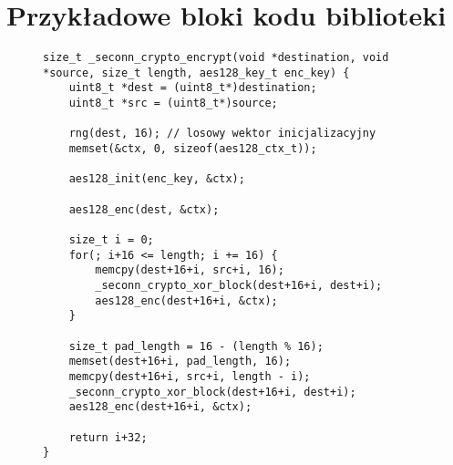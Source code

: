 \chapter{Przykładowe bloki kodu biblioteki}
\label{app:codesamples}




\begin{figure}[h]
\begin{lstlisting}[caption={Szyfrowanie CBC wraz z obsługą dopełnienia PKCS\#7},label={lst:encrypt}]
size_t _seconn_crypto_encrypt(void *destination, void *source, size_t length, aes128_key_t enc_key) {
    uint8_t *dest = (uint8_t*)destination;
    uint8_t *src = (uint8_t*)source;

    rng(dest, 16); // losowy wektor inicjalizacyjny
    memset(&ctx, 0, sizeof(aes128_ctx_t));

    aes128_init(enc_key, &ctx);

    aes128_enc(dest, &ctx);

    size_t i = 0;
    for(; i+16 <= length; i += 16) {
        memcpy(dest+16+i, src+i, 16);
        _seconn_crypto_xor_block(dest+16+i, dest+i);
        aes128_enc(dest+16+i, &ctx);
    }

    size_t pad_length = 16 - (length % 16);
    memset(dest+16+i, pad_length, 16);
    memcpy(dest+16+i, src+i, length - i);
    _seconn_crypto_xor_block(dest+16+i, dest+i);
    aes128_enc(dest+16+i, &ctx);

    return i+32;
}
\end{lstlisting}
\end{figure}

